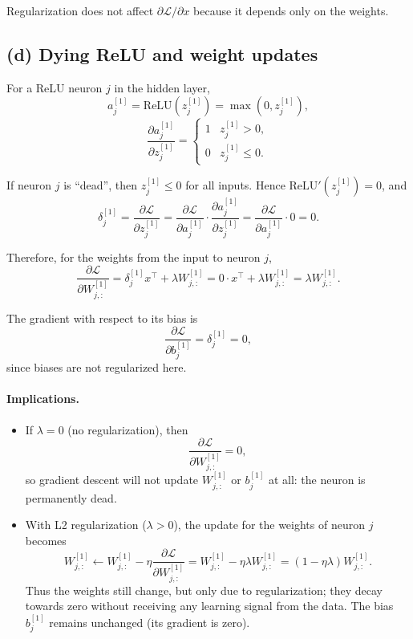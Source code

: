 \documentclass{article}
\begin{document}
Regularization does not affect $\partial\mathcal{L}/\partial x$ because it depends only on the weights.

\subsection{(d) Dying ReLU and weight updates}

For a ReLU neuron $j$ in the hidden layer,
\[
a^{[1]}_j = \mathrm{ReLU}(z^{[1]}_j) = \max(0,z^{[1]}_j),
\]
\[
\frac{\partial a^{[1]}_j}{\partial z^{[1]}_j} =
\begin{cases}
1 & z^{[1]}_j > 0,\\
0 & z^{[1]}_j \le 0.
\end{cases}
\]

If neuron $j$ is ``dead'', then $z^{[1]}_j \le 0$ for all inputs.
Hence $\mathrm{ReLU}'(z^{[1]}_j)=0$, and
\[
\delta^{[1]}_j = \frac{\partial\mathcal{L}}{\partial z^{[1]}_j}
= \frac{\partial\mathcal{L}}{\partial a^{[1]}_j}
\cdot \frac{\partial a^{[1]}_j}{\partial z^{[1]}_j}
= \frac{\partial\mathcal{L}}{\partial a^{[1]}_j} \cdot 0 = 0.
\]

Therefore, for the weights from the input to neuron $j$,
\[
\frac{\partial\mathcal{L}}{\partial W^{[1]}_{j,:}}
= \delta^{[1]}_j x^\top + \lambda W^{[1]}_{j,:}
= 0\cdot x^\top + \lambda W^{[1]}_{j,:}
= \lambda W^{[1]}_{j,:}.
\]

The gradient with respect to its bias is
\[
\frac{\partial\mathcal{L}}{\partial b^{[1]}_j}
= \delta^{[1]}_j = 0,
\]
since biases are not regularized here.

\paragraph{Implications.}
\begin{itemize}
	\item If $\lambda = 0$ (no regularization), then
	\[
	\frac{\partial\mathcal{L}}{\partial W^{[1]}_{j,:}} = 0,
	\]
	so gradient descent will not update $W^{[1]}_{j,:}$ or $b^{[1]}_j$ at all: the neuron is permanently dead.
	
	\item With L2 regularization ($\lambda > 0$), the update for the weights of neuron $j$ becomes
	\[
	W^{[1]}_{j,:} \leftarrow W^{[1]}_{j,:} - \eta \frac{\partial\mathcal{L}}{\partial W^{[1]}_{j,:}}
	= W^{[1]}_{j,:} - \eta \lambda W^{[1]}_{j,:}
	= (1 - \eta\lambda) W^{[1]}_{j,:}.
	\]
	Thus the weights still change, but only due to regularization; they decay towards zero without receiving any learning signal from the data. The bias $b^{[1]}_j$ remains unchanged (its gradient is zero).
\end{itemize}
\end{document}
